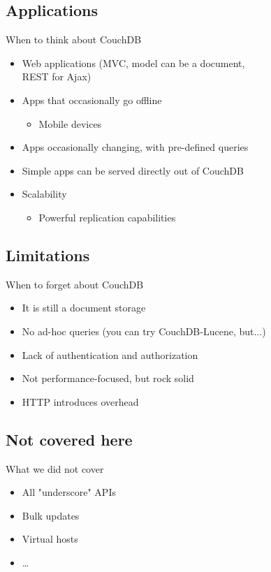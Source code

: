 \documentclass{beamer}
\begin{document}
\subsection{Applications}
\begin{frame}{When to think about CouchDB}
  \begin{itemize}
    \item Web applications (MVC, model can be a document,\\REST for Ajax)
    \item Apps that occasionally go offline
    \begin{itemize}
      \item Mobile devices
    \end{itemize}
    \item Apps occasionally changing, with pre-defined queries
    \item Simple apps can be served directly out of CouchDB
    \item Scalability
    \begin{itemize}
      \item Powerful replication capabilities
    \end{itemize}
  \end{itemize}
\end{frame}

\subsection{Limitations}
\begin{frame}{When to forget about CouchDB}
  \begin{itemize}
    \item It is still a document storage
    \item No ad-hoc queries (you can try CouchDB-Lucene, but...)
    \item Lack of authentication and authorization
    \item Not performance-focused, but rock solid
    \item HTTP introduces overhead
  \end{itemize}
\end{frame}

\subsection{Not covered here}
\begin{frame}{What we did not cover}
  \begin{itemize}
    \item All "underscore" APIs
    \item Bulk updates
    \item Virtual hosts
    \item \ldots
  \end{itemize}
\end{frame}
\end{document}
